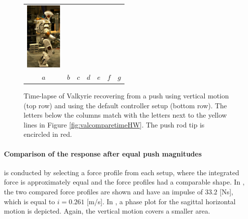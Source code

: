 \begin{figure}
\begin{tabular}{ccccccc}
    \includegraphics[width=0.7in]{STYLESTUFF/val7d_30} \\
    $a$&
    $b$&
    $c$&
    $d$&
    $e$&
    $f$&
    $g$\\
  \end{tabular}
  \caption{Time-lapse of Valkyrie recovering from a push using vertical motion (top row) and using the default controller setup (bottom row). The letters below the columns match with the letters next to the yellow lines in Figure \ref{fig:valcomparetimeHW}. The push rod tip is encircled in red.}
  \label{fig:val}
\end{figure}

\paragraph{Comparison of the response after equal push magnitudes} is conducted by selecting a force profile from each setup, where the integrated force is approximately equal and the force profiles had a comparable shape. In , the two compared force profiles are shown and have an impulse of $33.2$ [Ns], which is equal to $i=0.261$ [m/s]. In , a phase plot for the sagittal horizontal motion is depicted. Again, the vertical motion covers a smaller area. 

